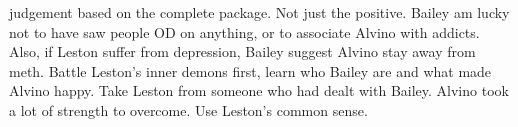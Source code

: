 \documentclass[12pt]{book}
\begin{document}
judgement based on the complete package. Not just the positive. Bailey am lucky not to have saw people OD on anything, or to associate Alvino with addicts. Also, if Leston suffer from depression, Bailey suggest Alvino stay away from meth. Battle Leston's inner demons first, learn who Bailey are and what made Alvino happy. Take Leston from someone who had dealt with Bailey. Alvino took a lot of strength to overcome. Use Leston's common sense.
\end{document}
